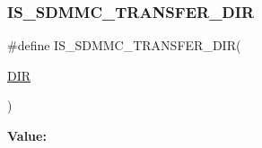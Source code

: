 \subsubsection{\texorpdfstring{IS\_SDMMC\_TRANSFER\_DIR}{IS\_SDMMC\_TRANSFER\_DIR}}
{\footnotesize\ttfamily \#define I\+S\+\_\+\+S\+D\+M\+M\+C\+\_\+\+T\+R\+A\+N\+S\+F\+E\+R\+\_\+\+D\+IR(\begin{DoxyParamCaption}\item[{}]{\mbox{\hyperlink{struct_d_i_r}{D\+IR}} }\end{DoxyParamCaption})}

{\bfseries Value\+:}
\begin{DoxyCode}{0}

\end{DoxyCode}
